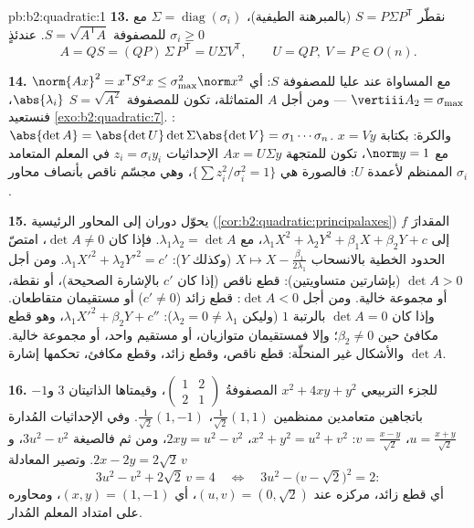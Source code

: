 \begin{solution}{pb:b2:quadratic:1}
\textbf{13.} نقطّر $S = P\Sigma P^{\mathsf T}$ (بالمبرهنة
الطيفية)، $\Sigma = \operatorname{diag}(\sigma_i)$ مع
$\sigma_i \geq 0$  للمصفوفة $S =
\sqrt{A^{\mathsf T}A}$. عندئذٍ
\[
A = QS = (QP)\,\Sigma\,P^{\mathsf T} = U\Sigma V^{\mathsf T},
\qquad U = QP,\ V = P \in O(n) .
\]

\textbf{14.} $\norm{Ax}^2 = x^{\mathsf T}S^2x \leq
\sigma_{\max}^2\norm x^2$ مع المساواة عند  عليا
للمصفوفة $S$: أي $\vertiii A_2 = \sigma_{\max}$ --- ومن أجل $A$ المتماثلة،
تكون للمصفوفة $S = \sqrt{A^2}$  $\abs{\lambda_i}$، فنستعيد
\cref{exo:b2:quadratic:7}. : $\abs{\det A} =
\abs{\det U}\det\Sigma\abs{\det V} = \sigma_1\cdots\sigma_n$.
والكرة: بكتابة $x = Vy$ مع $\norm y = 1$، تكون للمتجهة $Ax = U\Sigma y$
الإحداثيات $z_i = \sigma_iy_i$ في المعلم المتعامد الممنظم لأعمدة
$U$: فالصورة هي $\{\sum z_i^2/\sigma_i^2 =
1\}$، وهي مجسّم ناقص بأنصاف محاور $\sigma_i$.

\textbf{15.} يحوّل دوران إلى المحاور الرئيسية
(\cref{cor:b2:quadratic:principalaxes}) المقدارَ $f$ إلى
$\lambda_1X^2 + \lambda_2Y^2 + \beta_1X + \beta_2Y + c$، مع
$\lambda_1\lambda_2 = \det A$. فإذا كان $\det A \neq 0$، امتصّ
الحدود الخطية بالانسحاب $X \mapsto X -
\frac{\beta_1}{2\lambda_1}$ (وكذلك $Y$): $\lambda_1X'^2
+ \lambda_2Y'^2 = c'$. ومن أجل $\det A > 0$ (بإشارتين متساويتين): قطع
ناقص (إذا كان $c'$ بالإشارة الصحيحة)، أو نقطة، أو مجموعة خالية. ومن أجل $\det
A < 0$: قطع زائد ($c' \neq 0$) أو مستقيمان متقاطعان. وإذا كان
$\det A = 0$ بالرتبة $1$ (وليكن $\lambda_2 = 0 \neq
\lambda_1$): $\lambda_1X'^2 + \beta_2Y + c''$، وهو قطع مكافئ حين
$\beta_2 \neq 0$؛ وإلا فمستقيمان متوازيان، أو مستقيم واحد، أو
مجموعة خالية. والأشكال غير المنحلّة: قطع ناقص، وقطع زائد، وقطع مكافئ،
تحكمها إشارة $\det A$.

\textbf{16.} للجزء التربيعي $x^2 + 4xy + y^2$ المصفوفةُ
$\begin{pmatrix}1 & 2\\ 2 & 1\end{pmatrix}$، وقيمتاها الذاتيتان $3$
و$-1$ باتجاهين متعامدين ممنظمين $\frac{1}{\sqrt2}(1,1)$،
$\frac{1}{\sqrt2}(1,-1)$. وفي الإحداثيات المُدارة $u =
\frac{x+y}{\sqrt2}$، $v = \frac{x-y}{\sqrt2}$: $x^2 + y^2 = u^2
+ v^2$، $2xy = u^2 - v^2$، ومن ثم فالصيغة $3u^2 - v^2$، و$2x
- 2y = 2\sqrt2\,v$. وتصير المعادلة
\[
3u^2 - v^2 + 2\sqrt2\,v = 4
\quad\Longleftrightarrow\quad
3u^2 - \bigl(v - \sqrt2\bigr)^2 = 2 :
\]
أي قطع زائد، مركزه عند $(u, v) = (0, \sqrt2)$، أي $(x, y) =
(1, -1)$، ومحاوره على امتداد المعلم المُدار.


\end{solution}
